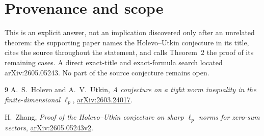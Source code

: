 \documentclass[11pt]{article}
\begin{document}
\section*{Provenance and scope}

This is an explicit answer, not an implication discovered only after an
unrelated theorem: the supporting paper names the Holevo--Utkin conjecture in
its title, cites the source throughout the statement, and calls Theorem~2 the
proof of its remaining cases.  A direct exact-title and exact-formula search
located arXiv:2605.05243.  No part of the source conjecture remains open.

\begin{thebibliography}{9}
A.~S.~Holevo and A.~V.~Utkin,
\emph{A conjecture on a tight norm inequality in the finite-dimensional
$\ell_p$},
\href{https://arxiv.org/abs/2603.24017}{arXiv:2603.24017}.

H.~Zhang,
\emph{Proof of the Holevo--Utkin conjecture on sharp $\ell_p$ norms for
zero-sum vectors},
\href{https://arxiv.org/abs/2605.05243}{arXiv:2605.05243v2}.
\end{thebibliography}
\end{document}
